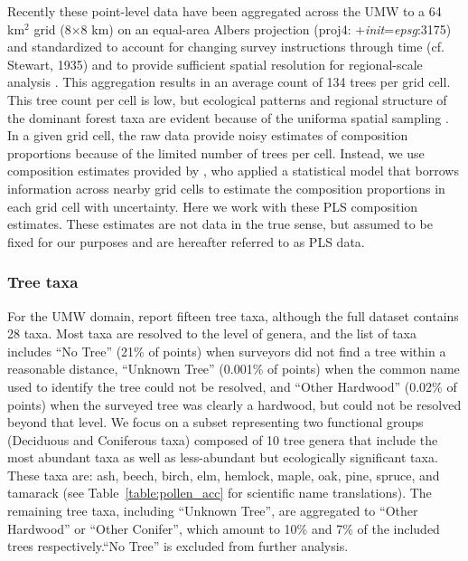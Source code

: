 \documentclass[12pt]{article}
\begin{document}
Recently these point-level data have been aggregated across the UMW to
a 64 km$^2$ grid (8$\times$8 km) on an equal-area Albers projection
(proj4: +\textit{init}=\textit{epsg}:3175) and standardized to account
for changing survey instructions through time (cf. Stewart, 1935) and
to provide sufficient spatial resolution for regional-scale analysis
\citep{goring_witness}.  This aggregation results in an average count
of 134 trees per grid cell. This tree count per cell is low, but
ecological patterns and regional structure of the dominant forest taxa
are evident because of the uniforma spatial sampling
\citep{goring_witness}. In a given grid cell, the raw data provide
noisy estimates of composition proportions because of the limited
number of trees per cell. Instead, we use composition estimates
provided by \citet{paciorek2015}, who applied a statistical model that
borrows information across nearby grid cells to estimate the
composition proportions in each grid cell with uncertainty. Here we
work with these PLS composition estimates. These estimates are not
data in the true sense, but assumed to be fixed for our purposes and
are hereafter referred to as PLS data.

\subsubsection{Tree taxa}

For the UMW domain, \citet{goring_witness} report fifteen tree taxa,
although the full dataset contains 28 taxa.  Most taxa are resolved to
the level of genera, and the list of taxa includes ``No Tree'' (21\%
of points) when surveyors did not find a tree within a reasonable
distance, ``Unknown Tree'' (0.001\% of points) when the common name
used to identify the tree could not be resolved, and ``Other
Hardwood'' (0.02\% of points) when the surveyed tree was clearly a
hardwood, but could not be resolved beyond that level. We focus on a
subset representing two functional groups (Deciduous and Coniferous
taxa) composed of 10 tree genera that include the most abundant taxa
as well as less-abundant but ecologically significant taxa. These taxa
are: ash, beech, birch, elm, hemlock, maple, oak, pine, spruce, and
tamarack (see Table~\ref{table:pollen_acc} for scientific name
translations). The remaining tree taxa, including ``Unknown Tree'',
are aggregated to ``Other Hardwood'' or ``Other Conifer'', which
amount to 10\% and 7\% of the included trees respectively.``No Tree''
is excluded from further analysis.
\end{document}
